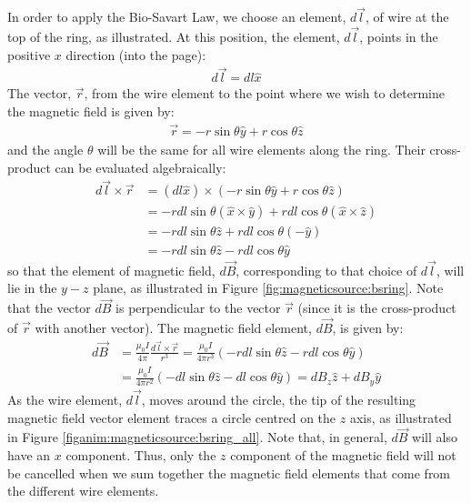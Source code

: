 In order to apply the Bio-Savart Law, we choose an element, $d\vec l$, of wire at the top of the ring, as illustrated. At this position, the element, $d\vec l$, points in the positive $x$ direction (into the page):
\begin{align*}
d\vec l = dl \hat x
\end{align*}
The vector, $\vec r$, from the wire element to the point where we wish to determine the magnetic field is given by:
\begin{align*}
\vec r =  - r\sin\theta \hat y+r\cos\theta \hat z
\end{align*}
and the angle $\theta$ will be the same for all wire elements along the ring. Their cross-product can be evaluated algebraically:
\begin{align*}
d\vec l \times \vec r &= (dl \hat x) \times ( - r\sin\theta \hat y+r\cos\theta \hat z)\\
&=-rdl\sin\theta (\hat x \times \hat y) + rdl\cos\theta (\hat x \times \hat z)\\
&=-rdl\sin\theta\hat z + rdl\cos\theta (-\hat y)\\
&=-rdl\sin\theta\hat z - rdl\cos\theta \hat y 
\end{align*}
so that the element of magnetic field, $d\vec B$, corresponding to that choice of $d\vec l$, will lie in the $y-z$ plane, as illustrated in Figure \ref{fig:magneticsource:bsring}. Note that the vector $d\vec B$ is perpendicular to the vector $\vec r$ (since it is the cross-product of $\vec r$ with another vector). The magnetic field element, $d\vec B$, is given by:
\begin{align*}
d\vec B &= \frac{\mu_0 I}{4\pi}\frac{d\vec l\times \vec r}{r^3}= \frac{\mu_0 I}{4\pi r^3}(-rdl\sin\theta\hat z - rdl\cos\theta \hat y )\\
&=\frac{\mu_0 I}{4\pi r^2}(-dl\sin\theta \hat z - dl\cos\theta \hat y)=dB_z\hat z + dB_y \hat y
\end{align*}
As the wire element, $d\vec l$, moves around the circle, the tip of the resulting magnetic field vector element traces a circle centred on the $z$ axis, as illustrated in Figure \ref{figanim:magneticsource:bsring_all}. Note that, in general, $d\vec B$ will also have an $x$ component. Thus, only the $z$ component of the magnetic field will not be cancelled when we sum together the magnetic field elements that come from the different wire elements.

